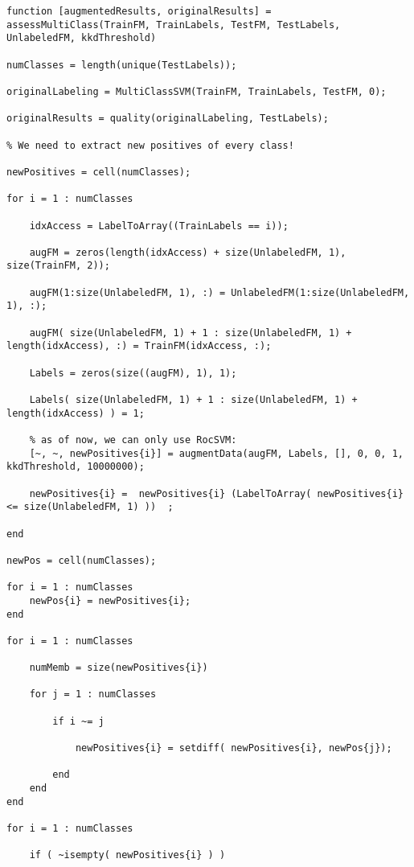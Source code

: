 \documentclass[12pt,twoside,notitlepage,amsart]{report} %
\begin{document}
\begin{lstlisting}
function [augmentedResults, originalResults] = assessMultiClass(TrainFM, TrainLabels, TestFM, TestLabels, UnlabeledFM, kkdThreshold)

numClasses = length(unique(TestLabels));

originalLabeling = MultiClassSVM(TrainFM, TrainLabels, TestFM, 0);

originalResults = quality(originalLabeling, TestLabels);

% We need to extract new positives of every class!

newPositives = cell(numClasses);

for i = 1 : numClasses 
    
    idxAccess = LabelToArray((TrainLabels == i));
    
    augFM = zeros(length(idxAccess) + size(UnlabeledFM, 1), size(TrainFM, 2));

    augFM(1:size(UnlabeledFM, 1), :) = UnlabeledFM(1:size(UnlabeledFM, 1), :);

    augFM( size(UnlabeledFM, 1) + 1 : size(UnlabeledFM, 1) + length(idxAccess), :) = TrainFM(idxAccess, :);

    Labels = zeros(size((augFM), 1), 1);
    
    Labels( size(UnlabeledFM, 1) + 1 : size(UnlabeledFM, 1) + length(idxAccess) ) = 1;
    
    % as of now, we can only use RocSVM:
    [~, ~, newPositives{i}] = augmentData(augFM, Labels, [], 0, 0, 1, kkdThreshold, 10000000);
    
    newPositives{i} =  newPositives{i} (LabelToArray( newPositives{i} <= size(UnlabeledFM, 1) ))  ;
    
end

newPos = cell(numClasses);

for i = 1 : numClasses
    newPos{i} = newPositives{i};
end

for i = 1 : numClasses
    
    numMemb = size(newPositives{i})
    
    for j = 1 : numClasses
        
        if i ~= j
            
            newPositives{i} = setdiff( newPositives{i}, newPos{j});
            
        end        
    end    
end

for i = 1 : numClasses
        
    if ( ~isempty( newPositives{i} ) )
        

\end{lstlisting}
\end{document}
